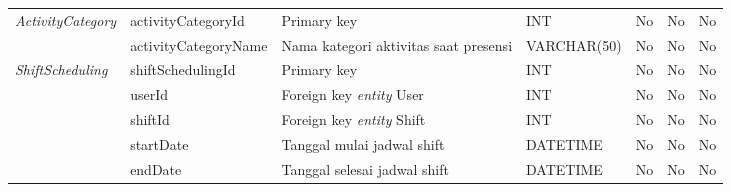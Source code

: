 \begin{longtable}{ |p{3cm}|p{3cm}|p{4cm}|p{3cm}|p{2cm}|p{2cm}|p{2cm}|}
\multirow{2}{*}{\textit{ActivityCategory}}
&activityCategoryId
&Primary key
&INT
&No
&No
&No
\\
\cline{2-7}
&activityCategoryName
&Nama kategori aktivitas saat presensi
&VARCHAR(50)
&No
&No
&No
\\ 
\hline

\multirow{5}{*}{\textit{ShiftScheduling}}
&shiftSchedulingId
&Primary key
&INT
&No
&No
&No
\\
\cline{2-7}
&userId
&Foreign key \textit{entity} User
&INT
&No
&No
&No
\\
\cline{2-7}
&shiftId
&Foreign key \textit{entity} Shift
&INT
&No
&No
&No
\\
\cline{2-7}
&startDate
&Tanggal mulai jadwal shift
&DATETIME
&No
&No
&No
\\
\cline{2-7}
&endDate
&Tanggal selesai jadwal shift
&DATETIME
&No
&No
&No
\\ 
\hline



\end{longtable}